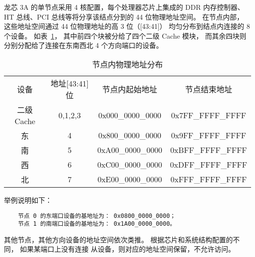龙芯 3A 的单节点采用 4 核配置，每个处理器芯片上集成的 DDR
内存控制器、 HT 总线、PCI 总线等将分享该结点分到的 44 位物理地址空间。
在节点内部， 这些地址空间通过 44 位物理地址的高 3 位（[43:41]）
均匀分布到结点内连接的 8 个设备。 如表~\ref{tab:nodeAddr}，
其中前四个块被分给了四个二级 Cache 模块， 而其余四块则分别分配给了连接在东南西北
4 个方向端口的设备。 
\begin{table}[h]
  \centering
  \begin{tabular}{|c|c|c|c|} \hline
    设备       & 地址[43:41]位  & 节点内起始地址    & 节点结束地址 \\ \hhline
    二级 Cache & 0,1,2,3        & 0x000\_0000\_0000 & 0x7FF\_FFFF\_FFFF \\ \hline
    东         & 4              & 0x800\_0000\_0000 & 0x9FF\_FFFF\_FFFF \\ \hline
    南         & 5              & 0xA00\_0000\_0000 & 0xBFF\_FFFF\_FFFF \\ \hline
    西         & 6              & 0xC00\_0000\_0000 & 0xDFF\_FFFF\_FFFF \\ \hline
    北         & 7              & 0xE00\_0000\_0000 & 0xFFF\_FFFF\_FFFF \\ \hline
  \end{tabular}
  \caption{节点内物理地址分布}
  \label{tab:nodeAddr}
\end{table}
\newline 举例说明如下：
\begin{verbatim}
    节点 0 的东端口设备的基地址为： 0x0800_0000_0000；
    节点 1 的南端口设备的基地址为： 0x1A00_0000_0000。
\end{verbatim}
其他节点，其他方向设备的地址空间依次类推。 根据芯片和系统结构配置的不同，
如果某端口上没有连接 从设备，则对应的地址空间保留，不允许访问。

